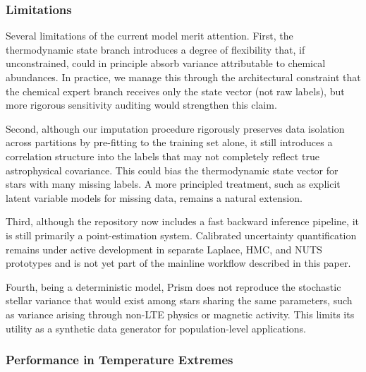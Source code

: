 \documentclass[preprint]{aastex701-1/aastex701}
\begin{document}
\subsubsection{Limitations}

Several limitations of the current model merit attention. First, the thermodynamic state
branch introduces a degree of flexibility that, if unconstrained, could in principle absorb
variance attributable to chemical abundances. In practice, we manage this through the
architectural constraint that the chemical expert branch receives only the state vector
(not raw labels), but more rigorous sensitivity auditing would strengthen this claim.

Second, although our imputation procedure rigorously preserves data isolation across partitions by pre-fitting to the training set alone, it still introduces a 
correlation structure into the labels that may not completely reflect true astrophysical
covariance. This could bias the thermodynamic state vector for stars with many missing
labels. A more principled treatment, such as explicit latent variable models for missing
data, remains a natural extension.

Third, although the repository now includes a fast backward inference pipeline, it is still
primarily a point-estimation system. Calibrated uncertainty quantification remains under
active development in separate Laplace, HMC, and NUTS prototypes and is not yet part of
the mainline workflow described in this paper.

Fourth, being a deterministic model, Prism does not reproduce the stochastic stellar
variance that would exist among stars sharing the same parameters, such as variance arising
through non-LTE physics or magnetic activity. This limits its utility as a synthetic data
generator for population-level applications.

\subsubsection{Performance in Temperature Extremes}
\end{document}
